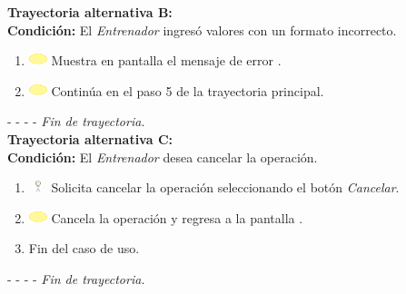 \textbf{\large{Trayectoria alternativa B:}}\\
\textbf{Condición: } El \textit{Entrenador} ingresó valores con un formato incorrecto.

\begin{enumerate}
	\item \includegraphics[width=15pt]{./Figuras/iconosCU/herramienta.png} Muestra en pantalla el mensaje de error .
	\item \includegraphics[width=15pt]{./Figuras/iconosCU/herramienta.png} Continúa en el paso 5 de la trayectoria principal.
\end{enumerate}

- - - - \textit{Fin de trayectoria.} \\

\textbf{\large{Trayectoria alternativa C:}}\\
\textbf{Condición: } El \textit{Entrenador} desea cancelar la operación.

\begin{enumerate}
	\item \includegraphics[width=15pt, height=10pt]{./Figuras/iconosCU/usuario.png} Solicita cancelar la operación seleccionando el botón \textit{Cancelar}.
	\item \includegraphics[width=15pt]{./Figuras/iconosCU/herramienta.png} Cancela la operación y regresa a la pantalla .
	\item Fin del caso de uso.
\end{enumerate}

- - - - \textit{Fin de trayectoria.} \\



\clearpage